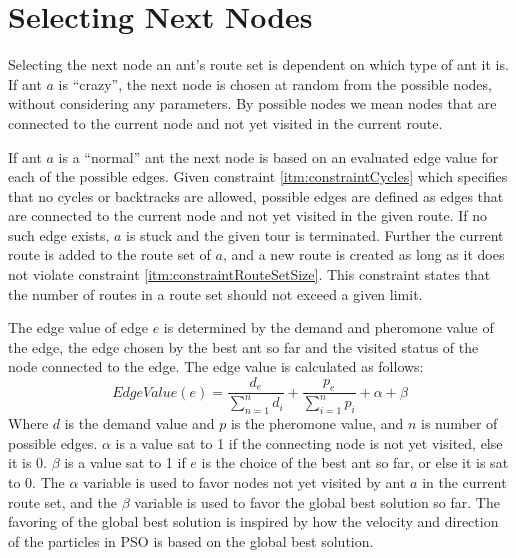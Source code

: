 \section{Selecting Next Nodes}
\label{sec:selectingNextNode}

Selecting the next node an ant's route set is dependent on which type of ant it is. If ant $a$ is ``crazy'', the next node is chosen at random from the possible nodes, without considering any parameters. By possible nodes we mean nodes that are connected to the current node and not yet visited in the current route.

If ant $a$ is a ``normal'' ant the next node is based on an evaluated edge value for each of the possible edges. Given constraint \vref{itm:constraintCycles} which specifies that no cycles or backtracks are allowed, possible edges are defined as edges that are connected to the current node and not yet visited in the given route. If no such edge exists, $a$ is stuck and the given tour is terminated. Further the current route is added to the route set of $a$, and a new route is created as long as it does not violate constraint \vref{itm:constraintRouteSetSize}. This constraint states that the number of routes in a route set should not exceed a given limit. 

The edge value of edge $e$ is determined by the demand and pheromone value of the edge, the edge chosen by the best ant so far and the visited status of the node connected to the edge. The edge value is calculated as follows: 
\newline
$$EdgeValue(e) = \frac{d_e}{\sum\limits^{n}_{n=1}d_i} + \frac{p_e}{\sum\limits^{n}_{i=1}p_i} + \alpha + \beta$$
\newline
Where $d$ is the demand value and $p$ is the pheromone value, and $n$ is number of possible edges. $\alpha$ is a value sat to 1 if the connecting node is not yet visited, else it is 0. $\beta$ is a value sat to 1 if $e$ is the choice of the best ant so far, or else it is sat to 0. The $\alpha$ variable is used to favor nodes not yet visited by ant $a$ in the current route set, and the $\beta$ variable is used to favor the global best solution so far. The favoring of the global best solution is inspired by how the velocity and direction of the particles in PSO is based on the global best solution. 

